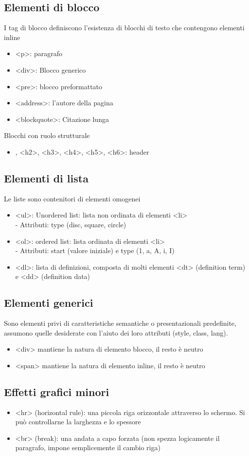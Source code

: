 \documentclass[a4paper,12pt]{article}
\begin{document}
\subsection*{Elementi di blocco}
I tag di blocco definiscono l’esistenza di blocchi di testo che contengono elementi inline
\begin{itemize}
  \item <p>: paragrafo
  \item <div>: Blocco generico
  \item <pre>: blocco preformattato
  \item <address>: l'autore della pagina
  \item <blockquote>: Citazione lunga
\end{itemize}
Blocchi con ruolo strutturale
\begin{itemize}
  \item <h1>, <h2>, <h3>, <h4>, <h5>, <h6>: header
\end{itemize}
\subsection*{Elementi di lista}
Le liste sono contenitori di elementi omogenei
\begin{itemize}
  \item <ul>: Unordered list: lista non ordinata di elementi <li> \\
  - Attributi: type (disc, square, circle)
  \item <ol>: ordered list: lista ordinata di elementi <li> \\
  - Attributi: start (valore iniziale) e type (1, a, A, i, I)
  \item <dl>: lista di definizioni, composta di molti elementi <dt> (definition term) e <dd> (definition data) 
\end{itemize}
\subsection*{Elementi generici}
Sono elementi privi di caratteristiche semantiche o presentazionali predefinite, assumono quelle desiderate con l’aiuto dei loro attributi (style, class, lang).
\begin{itemize}
  \item <div> mantiene la natura di elemento blocco, il resto è neutro
  \item <span> mantiene la natura di elemento inline, il resto è neutro
\end{itemize}
\subsection*{Effetti grafici minori}
\begin{itemize}
  \item <hr> (horizontal rule): una piccola riga orizzontale attraverso lo schermo. Si può controllarne la larghezza e lo spessore
  \item <br> (break): una andata a capo forzata (non spezza logicamente il paragrafo, impone semplicemente il cambio riga)
\end{itemize}
\end{document}
